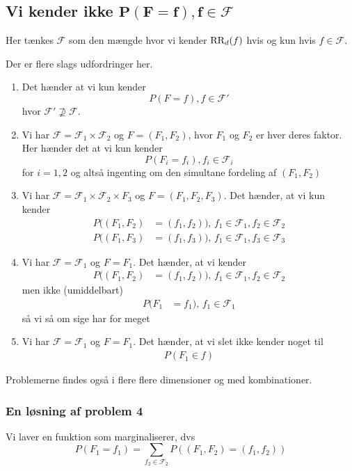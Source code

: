 \documentclass[a4paper, 12pt]{memoir}
\begin{document}
\subsection{Vi kender ikke $\bm{P(F=f), f\in \mathcal F}$}
Her tænkes $\mathcal F$ som den mængde hvor vi kender $\textup{RR}_d(f)$ hvis og kun hvis $f\in \mathcal F$.

Der er flere slags udfordringer her. 
\begin{enumerate}
\item
Det hænder at vi kun kender
\begin{equation*}
P(F=f), f \in \mathcal F'
\end{equation*}
hvor $\mathcal F'\not\supseteq \mathcal F$.
\item
Vi har $\mathcal F=\mathcal F_1 \times \mathcal F_2$ og $F=(F_1,F_2)$, hvor $F_1$ og $F_2$ er hver deres faktor. Her hænder det at vi kun kender
\begin{equation*}
P(F_i=f_i), f_i\in \mathcal F_i 
\end{equation*}
for $i=1,2$ og altså ingenting om den simultane fordeling af $(F_1,F_2)$
\item
Vi har $\mathcal F= \mathcal F_1\times \mathcal F_2\times F_3$ og $F=(F_1,F_2,F_3)$. Det hænder, at vi kun kender
\begin{align*}
P((F_1,F_2)&=(f_1,f_2)), \, f_1\in \mathcal F_1, f_2\in \mathcal F_2\\
P((F_1,F_3)&=(f_1,f_3)), \, f_1\in \mathcal F_1, f_3\in \mathcal F_3
\end{align*}
\item
Vi har $\mathcal F= \mathcal F_1$ og $F=F_1$. Det hænder, at vi kender
\begin{align*}
P((F_1,F_2)&=(f_1,f_2)), \, f_1\in \mathcal F_1, f_2\in \mathcal F_2
\end{align*}
men ikke (umiddelbart)
\begin{align*}
P(F_1&=f_1), \, f_1\in \mathcal F_1
\end{align*}
så vi så om sige har for meget
\item
Vi har $\mathcal F= \mathcal F_1$ og $F=F_1$. Det hænder, at vi slet ikke kender noget til
\begin{align*}
P(F_1\in f)
\end{align*}
\end{enumerate}
Problemerne findes også i flere flere dimensioner og med kombinationer. 

\subsubsection*{En løsning af problem 4}
Vi laver en funktion som marginaliserer, dvs
\begin{equation*}
P(F_1=f_1)=\sum_{f_2\in \mathcal F_2} P((F_1,F_2)=(f_1,f_2))
\end{equation*}
\end{document}
